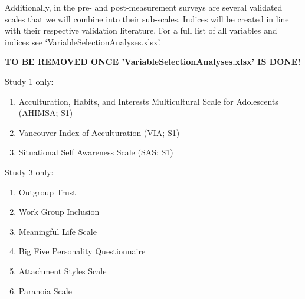 \documentclass[]{article}
\providecommand{\tightlist}{%
\setlength{\itemsep}{0pt}\setlength{\parskip}{0pt}}
\begin{document}
Additionally, in the pre- and post-measurement surveys are several
validated scales that we will combine into their sub-scales. Indices
will be created in line with their respective validation literature. For
a full list of all variables and indices see
`VariableSelectionAnalyses.xlsx'.

\color{red}

\textbf{TO BE REMOVED ONCE 'VariableSelectionAnalyses.xlsx' IS DONE!}

\color{black}


\color{editPurple}

Study 1 only:

\begin{enumerate}
\def\labelenumi{\arabic{enumi}.}
\tightlist
\item
  Acculturation, Habits, and Interests Multicultural Scale for
  Adolescents (AHIMSA; S1)
\item
  Vancouver Index of Acculturation (VIA; S1)
\item
  Situational Self Awareness Scale (SAS; S1)
\end{enumerate}

Study 3 only:

\begin{enumerate}
\def\labelenumi{\arabic{enumi}.}
\tightlist
\item
  Outgroup Trust
\item
  Work Group Inclusion
\item
  Meaningful Life Scale
\item
  Big Five Personality Questionnaire
\item
  Attachment Styles Scale
\item
  Paranoia Scale
\end{enumerate}
\end{document}
